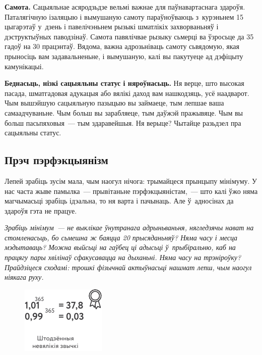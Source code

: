 \textbf{Самота.} Сацыяльнае асяродзьдзе вельмі важнае для паўнавартаснага здароўя. Паталягічную ізаляцыю і вымушаную самоту параўноўваюць з~курэньнем 15 цыгарэтаў у~дзень і павелічэньнем рызыкі шматлікіх захворваньняў і дэструктыўных паводзінаў. Самота павялічвае рызыку сьмерці ва ўзросьце да 35 гадоў на 30 працэнтаў. Вядома, важна адрозьніваць самоту сьвядомую, якая прыносіць вам задавальненьне, і вымушаную, калі вы пакутуеце ад дэфіцыту камунікацыі.

\textbf{Беднасьць, нізкі сацыяльны статус і няроўнасьць.} Ня верце, што высокая пасада, шматгадовая адукацыя або вялікі даход вам нашкодзяць, усё наадварот. Чым вышэйшую сацыяльную пазыцыю вы займаеце, тым лепшае ваша самаадчуваньне. Чым больш вы зарабляеце, тым даўжэй пражывяце. Чым вы больш пасьпяховыя~--- тым здаравейшыя. Ня верыце? Чытайце разьдзел пра сацыяльны статус.

\subsection*{Прэч пэрфэкцыянізм}

Лепей зрабіць зусім мала, чым наогул нічога: трымайцеся прынцыпу мінімуму. У нас часта жыве памылка~--- прывітаньне пэрфэкцыяністам,~--- што калі ўжо няма магчымасьці зрабіць ідэальна, то ня варта і пачынаць. Але ў~адносінах да здароўя гэта не працуе. 


\emph{Зрабіць мінімум~--- не выклікае ўнутранага адрыньваньня, нягледзячы нават на стомленасьць, бо сьмешна ж баяцца 20 прысяданьняў? Няма часу і месца мэдытаваць? Можна выйсьці на гаўбец ці адысьці ў~прыбіральню, каб на працягу пары хвілінаў сфакусавацца на дыханьні. Няма часу на трэніроўку? Прайдзіцеся сходамі: трошкі фізычнай актыўнасьці нашмат лепш, чым наогул ніякага руху.}

\begin{figure}[htb!]
  \centering
  \includegraphics[scale=1.5]{willpower/ch3/8.pdf}
\end{figure}

